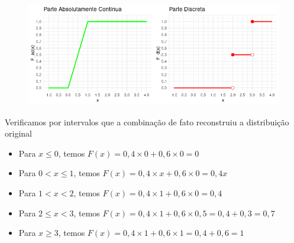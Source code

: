 \begin{frame}
\begin{figure}[!htbp]
	\begin{center}
		\includegraphics[scale=0.52]{
			discreteContinua.png}
	\end{center}
\end{figure}




Verificamos por intervalos que a combinação de fato reconstruiu a distribuição original



\begin{itemize}	
\item Para \( x \leq 0 \), temos $
	F(x) = 0{,}4 \times 0 + 0{,}6 \times 0 = 0
	$
	
\item Para \( 0 < x \leq 1 \), temos
	$
	F(x) = 0{,}4 \times x + 0{,}6 \times 0 = 0{,}4 x
	$
	
\item Para \( 1 < x < 2 \), temos $
	F(x) = 0{,}4 \times 1 + 0{,}6 \times 0 = 0{,}4
	$
	
\item Para \( 2 \leq x < 3 \), temos $
	F(x) = 0{,}4 \times 1 + 0{,}6 \times 0{,}5 = 0{,}4 + 0{,}3 = 0{,}7
	$
	
\item Para \( x \geq 3 \), temos $
	F(x) = 0{,}4 \times 1 + 0{,}6 \times 1 = 0{,}4 + 0{,}6 = 1
	$
\end{itemize}	




\end{frame}	

